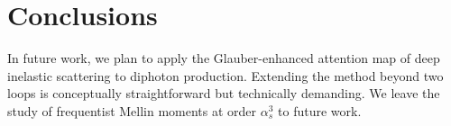 \section{Conclusions}\label{sec:conclusions}

In future work, we plan to apply the Glauber-enhanced attention map of
deep inelastic scattering to diphoton production. Extending the method
beyond two loops is conceptually straightforward but technically
demanding. We leave the study of frequentist Mellin moments at order
$\alpha_s^3$ to future work.

